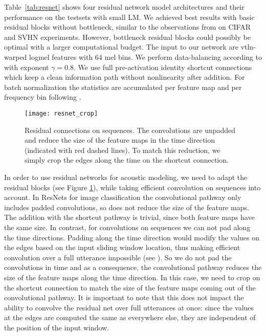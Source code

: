 \documentclass[a4paper]{article}
\begin{document}
Table~\ref{tab:resnet} shows four residual network model architectures and their performance on the testsets with small LM.
We achieved best results with basic residual blocks without bottleneck, similar to the observations from \cite{zagoruyko2016wide} on CIFAR and SVHN experiments.
However, bottleneck residual blocks could possibly be optimal with a larger computational budget.
\nocite{he2016identity, sercu2015very, sercu2016advances, sercu2016dense} The input to our network are vtln-warped logmel features with 64 mel bins.
We perform data-balancing according to \cite{sercu2015very} with exponent $\gamma=0.8$.
We use full pre-activation identity shortcut connections which keep a clean information path \cite{he2016identity} without nonlinearity after addition.
For batch normalization the statistics are accumulated per feature map and per frequency bin following \cite{sercu2016dense}.

\begin{figure}[tb]
  \begin{center}
       \texttt{[image: resnet\_crop]}
       \caption{Residual connections on sequences. The convolutions are unpadded and reduce the size of the feature maps in the time direction (indicated with red dashed lines). 
       To match this reduction, we simply crop the edges along the time on the shortcut connection.}
       \label{fig:resnet}
  \end{center}
\end{figure}

In order to use residual networks for acoustic modeling, we need to adapt the residual blocks (see Figure \ref{fig:resnet}), while taking efficient convolution on sequences into account.
In ResNets for image classification the convolutional pathway only includes padded convolutions, so does not reduce the size of the feature maps.
The addition with the shortcut pathway is trivial, since both feature maps have the same size.
In contrast, for convolutions on sequences we can not pad along the time directions.
Padding along the time direction would modify the values on the edges based on the input sliding window location, thus making efficient convolution over a full utterance impossible (see \cite{sercu2016advances}).
So we do not pad the convolutions in time and as a consequence, the convolutional pathway reduces the size of the feature maps along the time direction.
In this case, we need to crop on the shortcut connection to match the size of the feature maps coming out of the convolutional pathway.
It is important to note that this does not impact the ability to convolve the residual net over full utterances at once:
since the values at the edges are computed the same as everywhere else, they are independent of the position of the input window.
\end{document}
